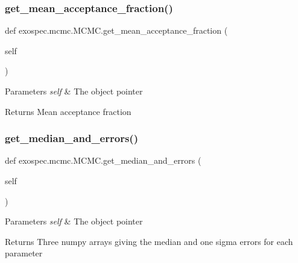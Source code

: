\subsubsection{\texorpdfstring{get\+\_\+mean\+\_\+acceptance\+\_\+fraction()}{get\_mean\_acceptance\_fraction()}}
{\footnotesize\ttfamily def exospec.\+mcmc.\+M\+C\+M\+C.\+get\+\_\+mean\+\_\+acceptance\+\_\+fraction (\begin{DoxyParamCaption}\item[{}]{self }\end{DoxyParamCaption})}


\begin{DoxyParams}{Parameters}
{\em self} & The object pointer \\
\hline
\end{DoxyParams}
\begin{DoxyReturn}{Returns}
Mean acceptance fraction 
\end{DoxyReturn}
\mbox{\label{classexospec_1_1mcmc_1_1_m_c_m_c_a7fe8d9326590fe7cc875fa5118eaa617}} 
\subsubsection{\texorpdfstring{get\+\_\+median\+\_\+and\+\_\+errors()}{get\_median\_and\_errors()}}
{\footnotesize\ttfamily def exospec.\+mcmc.\+M\+C\+M\+C.\+get\+\_\+median\+\_\+and\+\_\+errors (\begin{DoxyParamCaption}\item[{}]{self }\end{DoxyParamCaption})}


\begin{DoxyParams}{Parameters}
{\em self} & The object pointer \\
\hline
\end{DoxyParams}
\begin{DoxyReturn}{Returns}
Three numpy arrays giving the median and one sigma errors for each parameter 
\end{DoxyReturn}
\mbox{\label{classexospec_1_1mcmc_1_1_m_c_m_c_a4eef4b5f8fd95075890dfaf74d624c11}} 
